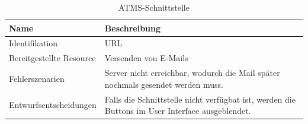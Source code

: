 \begin{table}[H]
	\centering
	\caption{ATMS-Schnittstelle}
	\begin{tabular}{ | p{4cm} | p{11cm} | }
		\toprule
		{\textbf{Name}} & {\textbf{Beschreibung}} \\
		\midrule
		Identifikation & URL\\ \hline
		Bereitgestellte Resource & Versenden von E-Mails\\ \hline
		Fehlerszenarien & Server nicht erreichbar, wodurch die Mail später nochmals gesendet werden muss.\\ \hline
		Entwurfsentscheidungen & Falls die Schnittstelle nicht verfügbat ist, werden die Buttons im User Interface ausgeblendet.\\
		\bottomrule
	\end{tabular}
\end{table}
